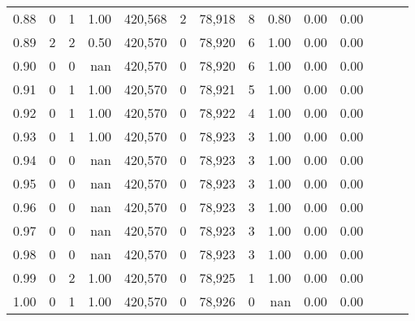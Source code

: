 \begin{tabular}{rrrrrrrrrrrrrr}
0.88 &       0 &      1 &  1.00 &  420,568 &        2 &  78,918 &       8 &  0.80 &  0.00 &      0.00 \\
0.89 &       2 &      2 &  0.50 &  420,570 &        0 &  78,920 &       6 &  1.00 &  0.00 &      0.00 \\
0.90 &       0 &      0 &   nan &  420,570 &        0 &  78,920 &       6 &  1.00 &  0.00 &      0.00 \\
0.91 &       0 &      1 &  1.00 &  420,570 &        0 &  78,921 &       5 &  1.00 &  0.00 &      0.00 \\
0.92 &       0 &      1 &  1.00 &  420,570 &        0 &  78,922 &       4 &  1.00 &  0.00 &      0.00 \\
0.93 &       0 &      1 &  1.00 &  420,570 &        0 &  78,923 &       3 &  1.00 &  0.00 &      0.00 \\
0.94 &       0 &      0 &   nan &  420,570 &        0 &  78,923 &       3 &  1.00 &  0.00 &      0.00 \\
0.95 &       0 &      0 &   nan &  420,570 &        0 &  78,923 &       3 &  1.00 &  0.00 &      0.00 \\
0.96 &       0 &      0 &   nan &  420,570 &        0 &  78,923 &       3 &  1.00 &  0.00 &      0.00 \\
0.97 &       0 &      0 &   nan &  420,570 &        0 &  78,923 &       3 &  1.00 &  0.00 &      0.00 \\
0.98 &       0 &      0 &   nan &  420,570 &        0 &  78,923 &       3 &  1.00 &  0.00 &      0.00 \\
0.99 &       0 &      2 &  1.00 &  420,570 &        0 &  78,925 &       1 &  1.00 &  0.00 &      0.00 \\
1.00 &       0 &      1 &  1.00 &  420,570 &        0 &  78,926 &       0 &   nan &  0.00 &      0.00 \\
\bottomrule
\end{tabular}
